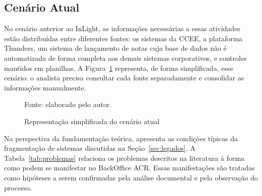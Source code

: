 \subsection{Cenário Atual}

No cenário anterior ao InLight, as informações necessárias a essas atividades estão distribuídas entre diferentes fontes: os sistemas da CCEE, a plataforma Thunders, um sistema de lançamento de notas cuja base de dados não é automatizada de forma completa aos demais sistemas corporativos, e controles mantidos em planilhas. A Figura~\ref{fig:as-is} representa, de forma simplificada, esse cenário: o analista precisa consultar cada fonte separadamente e consolidar as informações manualmente.

\begin{figure}[H]
\centering
\caption{Representação simplificada do cenário atual}
\label{fig:as-is}

\vspace{0.2cm}
{\footnotesize Fonte: elaborado pelo autor.}
\end{figure}

Na perspectiva da fundamentação teórica, apresenta as condições típicas da fragmentação de sistemas discutidas na Seção~\ref{sec:legados}. A Tabela~\ref{tab:problemas} relaciona os problemas descritos na literatura à forma como podem se manifestar no BackOffice ACR. Essas manifestações são tratadas como hipóteses a serem confirmadas pela análise documental e pela observação do processo.

